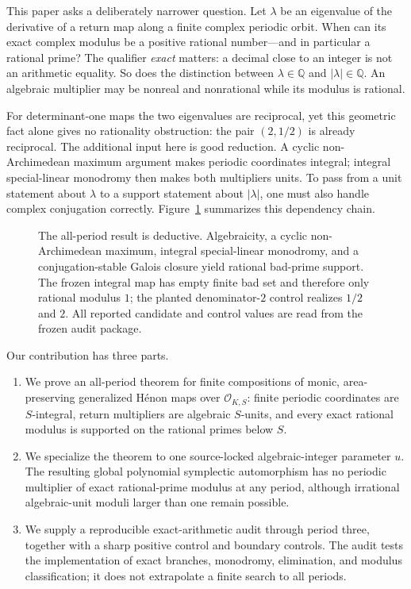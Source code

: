 \documentclass[11pt]{article}
\theoremstyle{definition}
\theoremstyle{remark}
\newcommand{\Q}{\mathbb Q}
\newcommand{\OKS}{\mathcal O_{K,S}}
\begin{document}
This paper asks a deliberately narrower question.  Let $\lambda$ be an
eigenvalue of the derivative of a return map along a finite complex periodic
orbit.  When can its exact complex modulus be a positive rational number---and
in particular a rational prime?  The qualifier \emph{exact} matters: a decimal
close to an integer is not an arithmetic equality.  So does the distinction
between $\lambda\in\Q$ and $|\lambda|\in\Q$.  An algebraic multiplier may be
nonreal and nonrational while its modulus is rational.

For determinant-one maps the two eigenvalues are reciprocal, yet this
geometric fact alone gives no rationality obstruction: the pair $(2,1/2)$ is
already reciprocal.  The additional input here is good reduction.  A cyclic
non-Archimedean maximum argument makes periodic coordinates integral; integral
special-linear monodromy then makes both multipliers units.  To pass from a
unit statement about $\lambda$ to a support statement about $|\lambda|$, one
must also handle complex conjugation correctly.  Figure~\ref{fig:certificate}
summarizes this dependency chain.

\begin{figure}[t]
  \centering
  \GoodReductionCertificateFigure
  \caption{The all-period result is deductive.  Algebraicity, a cyclic
  non-Archimedean maximum, integral special-linear monodromy, and a
  conjugation-stable Galois closure yield rational bad-prime support.  The
  frozen integral map has empty finite bad set and therefore only rational
  modulus $1$; the planted denominator-$2$ control realizes $1/2$ and $2$.
  All reported candidate and control values are read from the frozen audit
  package.}
  \label{fig:certificate}
\end{figure}

Our contribution has three parts.
\begin{enumerate}
  \item We prove an all-period theorem for finite compositions of monic,
  area-preserving generalized H\'enon maps over $\OKS$: finite periodic
  coordinates are $S$-integral, return multipliers are algebraic $S$-units,
  and every exact rational modulus is supported on the rational primes below
  $S$.
  \item We specialize the theorem to one source-locked algebraic-integer
  parameter $u$.  The resulting global polynomial symplectic automorphism has
  no periodic multiplier of exact rational-prime modulus at any period,
  although irrational algebraic-unit moduli larger than one remain possible.
  \item We supply a reproducible exact-arithmetic audit through period three,
  together with a sharp positive control and boundary controls.  The audit
  tests the implementation of exact branches, monodromy, elimination, and
  modulus classification; it does not extrapolate a finite search to all
  periods.
\end{enumerate}
\end{document}
